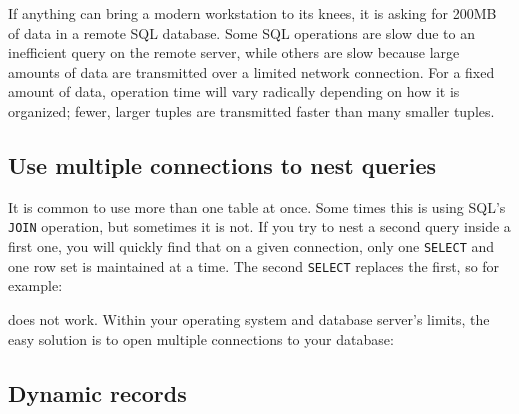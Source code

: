If anything can bring a modern workstation to its knees, it is asking
for 200MB of data in a remote SQL database. Some SQL operations are
slow due to an inefficient query on the remote server, while others are
slow because large amounts of data are transmitted over a limited
network connection. For a fixed amount of data, operation time will
vary radically depending on how it is organized; fewer, larger tuples
are transmitted faster than many smaller tuples.

\subsection{Use multiple connections to nest queries}

It is common to use more than one table at once. Some times this is
using SQL's \texttt{JOIN} operation, but sometimes it
is not. If you try to nest a second query inside a first one, you will
quickly find that on a given connection, only one \texttt{SELECT} and
one row set is maintained at a time. The second \texttt{SELECT}
replaces the first, so for example:


\noindent
does not work. Within your operating system and database
server's limits, the easy solution is to open multiple
connections to your database:


\subsection{Dynamic records}

